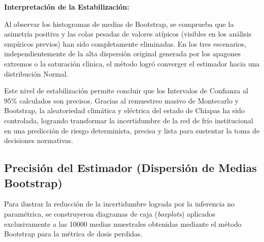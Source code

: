 \documentclass[
  spanish,
  letterpaper,
  DIV=11,
  numbers=noendperiod]{scrreprt}
\theoremstyle{plain}
\theoremstyle{plain}
\theoremstyle{plain}
\theoremstyle{definition}
\theoremstyle{remark}
\begin{document}
\textbf{Interpretación de la Estabilización:}

Al observar los histogramas de medias de Bootstrap, se comprueba que la
asimetría positiva y las colas pesadas de valores atípicos (visibles en
los análisis empíricos previos) han sido completamente eliminadas. En
los tres escenarios, independientemente de la alta dispersión original
generada por los apagones extremos o la saturación clínica, el método
logró converger el estimador hacia una distribución Normal.

Este nivel de estabilización permite concluir que los Intervalos de
Confianza al 95\% calculados son precisos. Gracias al remuestreo masivo
de Montecarlo y Bootstrap, la aleatoriedad climática y eléctrica del
estado de Chiapas ha sido controlada, logrando transformar la
incertidumbre de la red de frío institucional en una predicción de
riesgo determinista, precisa y lista para sustentar la toma de
decisiones normativas.

\subsection{Precisión del Estimador (Dispersión de Medias
Bootstrap)}\label{precisiuxf3n-del-estimador-dispersiuxf3n-de-medias-bootstrap}

Para ilustrar la reducción de la incertidumbre lograda por la inferencia
no paramétrica, se construyeron diagramas de caja (\emph{boxplots})
aplicados exclusivamente a las 10000 medias muestrales obtenidas
mediante el método Bootstrap para la métrica de dosis perdidas.
\end{document}
